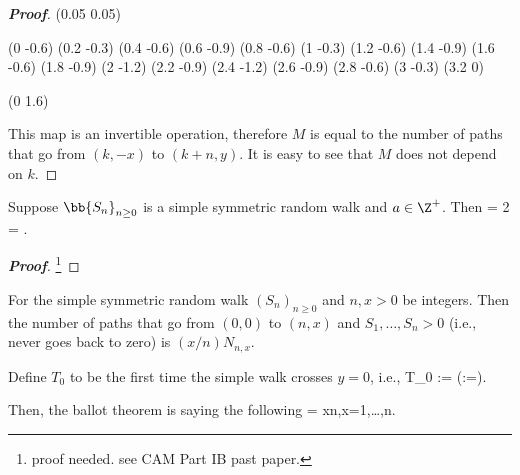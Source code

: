 \begin{proof}[\bf Proof]
{\lpatt (0.05 0.05)

\move (0 -0.6) \lvec (0.2 -0.3) \lvec (0.4 -0.6) \lvec (0.6 -0.9) \lvec (0.8 -0.6) \lvec (1 -0.3) \lvec (1.2 -0.6) \lvec (1.4 -0.9) \lvec (1.6 -0.6) \lvec (1.8 -0.9) \lvec (2 -1.2) \lvec (2.2 -0.9) \lvec (2.4 -1.2) \lvec (2.6 -0.9) \lvec
(2.8 -0.6) \lvec (3 -0.3) \lvec (3.2 0)


\move (0 1.6)

}

This map is an invertible operation, therefore $M$ is equal to the number of paths that go from $(k,-x)$ to $(k+n,y)$. It is easy to see that $M$ does not depend on $k$.
\end{proof}

\begin{corollary}
Suppose $\bb{S_n}_{n\geq 0}$ is a simple symmetric random walk and $a\in \Z^+$. Then
\be
\pro{} = 2\pro{} = \pro{}.
\ee
\end{corollary}

\begin{proof}[\bf Proof]
\footnote{proof needed. see CAM Part IB past paper.}
\end{proof}



\begin{theorem}\label{thm:ballot_problem}
For the simple symmetric random walk $(S_n)_{n\geq 0}$ and $n,x>0$ be integers. Then the number of paths that go from $(0,0)$ to $(n,x)$ and $S_1,\dots,S_n>0$ (i.e., never goes back to zero) is $(x/n) N_{n,x}$.
\end{theorem}

\begin{remark}
Define $T_0$ to be the first time the simple walk crosses $y=0$, i.e.,
\be
T_0 := \inf{}\qquad (\inf \emptyset :=\infty).
\ee

Then, the ballot theorem is saying the following
\be
\pro{} = \frac xn,\qquad \forall x=1,\dots,n.
\ee
\end{remark}

